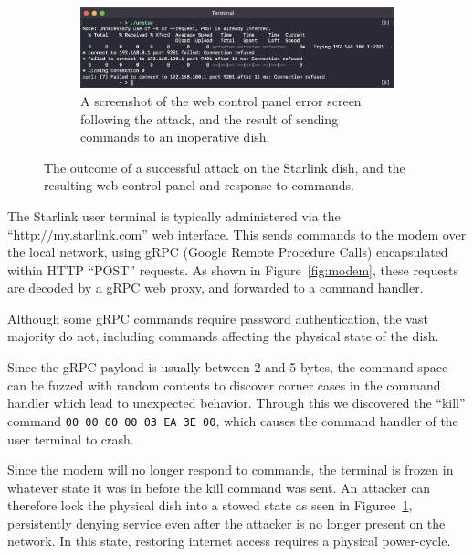 \begin{figure}
\begin{subfigure}{.52011\textwidth}
        \centering\includegraphics[width=\textwidth]{img/unstow.png}
        \caption{A screenshot of the web control panel error screen following the attack, and the result of sending commands to an inoperative dish.}
    \end{subfigure}
\caption{The outcome of a successful attack on the Starlink dish, and the resulting web control panel and response to commands.}
\label{fig:attack-outcome}
\vspace{-1.5em}
\end{figure}

The Starlink user terminal is typically administered via the ``\url{http://my.starlink.com}'' web interface.
This sends commands to the modem over the local network, using gRPC (Google Remote Procedure Calls) encapsulated within HTTP ``POST'' requests.
As shown in Figure~\ref{fig:modem}, these requests are decoded by a gRPC web proxy, and forwarded to a command handler.

Although some gRPC commands require password authentication, the vast majority do not, including commands affecting the physical state of the dish.

Since the gRPC payload is usually between 2 and 5 bytes, the command space can be fuzzed with random contents to discover corner cases in the command handler which lead to unexpected behavior.
Through this we discovered the ``kill'' command \lstinline{00 00 00 00 03 EA 3E 00}, which causes the command handler of the user terminal to crash.

Since the modem will no longer respond to commands, the terminal is frozen in whatever state it was in before the kill command was sent.
An attacker can therefore lock the physical dish into a stowed state as seen in Figuree~\ref{fig:attack-outcome}, persistently denying service even after the attacker is no longer present on the network.
In this state, restoring internet access requires a physical power-cycle.
